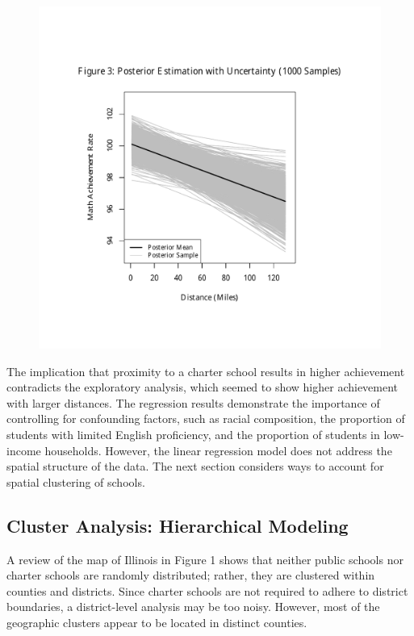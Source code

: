 \documentclass[11pt]{article}
\begin{document}
\begin{figure}[H]
\centering
    \includegraphics[trim= 0in 0in 0in 1in,clip,scale=0.8]{post_lines}
\end{figure}

The implication that proximity to a charter school results in higher achievement contradicts the exploratory analysis, which seemed to show higher achievement with larger distances.  The regression results demonstrate the importance of controlling for confounding factors, such as racial composition, the proportion of students with limited English proficiency, and the proportion of students in low-income households.  However, the linear regression model does not address the spatial structure of the data.  The next section considers ways to account for spatial clustering of schools.

\subsection{Cluster Analysis: Hierarchical Modeling}
A review of the map of Illinois in Figure 1 shows that neither public schools nor charter schools are randomly distributed; rather, they are clustered within counties and districts.  Since charter schools are not required to adhere to district boundaries, a district-level analysis may be too noisy.  However, most of the geographic clusters appear to be located in distinct counties.  
\end{document}
